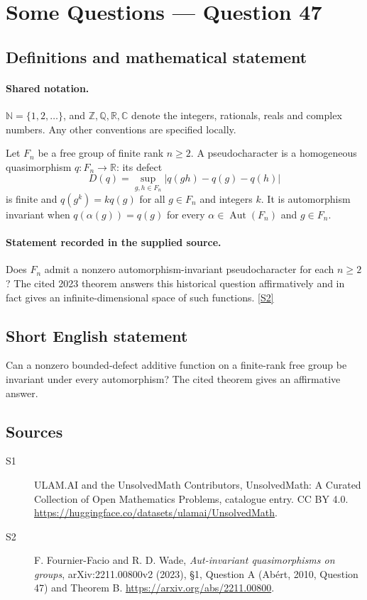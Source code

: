 \documentclass[11pt]{article}
\newcommand{\sref}[2]{\hyperlink{source:#1:#2}{[S#2]}}
\begin{document}
\section{Some Questions — Question 47}\label{statement}

\subsection{Definitions and mathematical statement}

\paragraph{Shared notation.}$\mathbb N=\{1,2,\ldots\}$, and $\mathbb Z,\mathbb Q,\mathbb R,\mathbb C$ denote the integers, rationals, reals and complex numbers. Any other conventions are specified locally.


Let $F_n$ be a free group of finite rank $n\geq2$. A pseudocharacter is a homogeneous quasimorphism $q:F_n\to\mathbb R$: its defect
\[D(q)=\sup_{g,h\in F_n}|q(gh)-q(g)-q(h)|
\]
is finite and $q(g^k)=kq(g)$ for all $g\in F_n$ and integers $k$. It is automorphism invariant when $q(\alpha(g))=q(g)$ for every $\alpha\in\operatorname{Aut}(F_n)$ and $g\in F_n$.
\paragraph{Statement recorded in the supplied source.}
Does $F_n$ admit a nonzero automorphism-invariant pseudocharacter for each $n\geq2$? The cited 2023 theorem answers this historical question affirmatively and in fact gives an infinite-dimensional space of such functions. \sref{statement}{2}
\subsection{Short English statement}
Can a nonzero bounded-defect additive function on a finite-rank free group be invariant under every automorphism? The cited theorem gives an affirmative answer.
\subsection{Sources}
\begin{description}
\item[\hypertarget{source:statement:1}{S1}] ULAM.AI and the UnsolvedMath Contributors, UnsolvedMath: A Curated Collection of Open Mathematics Problems, catalogue entry. CC BY 4.0. \url{https://huggingface.co/datasets/ulamai/UnsolvedMath}.
\item[\hypertarget{source:statement:2}{S2}] F. Fournier-Facio and R. D. Wade, \emph{Aut-invariant quasimorphisms on groups}, arXiv:2211.00800v2 (2023), §1, Question A (Abért, 2010, Question 47) and Theorem B. \url{https://arxiv.org/abs/2211.00800}.
\end{description}
\label{end:statement}
\end{document}
